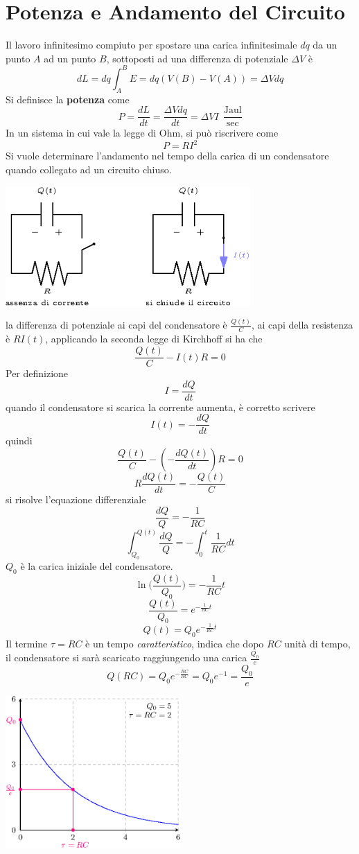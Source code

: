 \documentclass[10pt, letterpaper]{report}
\begin{document}
\section{Potenza e Andamento del Circuito}
Il lavoro infinitesimo compiuto per spostare una carica infinitesimale $dq$ da un punto $A$ ad un punto $B$, sottoposti ad una differenza di potenziale $\Delta V$ è 
$$ dL=dq\int_A^B E = dq(V(B)-V(A))= \Delta V dq$$
Si definisce la \textbf{potenza} come 
$$ P=\frac{dL}{dt}=\frac{\Delta Vdq}{dt}=\Delta V I \ \  \frac{\text{Jaul}}{\text{sec}}$$
In un sistema in cui vale la legge di Ohm, si può riscrivere come 
$$ P=RI^2$$
Si vuole determinare l'andamento nel tempo della carica di un condensatore quando collegato ad un circuito chiuso.\begin{center}
    \includegraphics[width=0.7\textwidth]{images/caricaCondensatoreTempo.eps}
\end{center}
la differenza di potenziale ai capi del  condensatore è $\frac{Q(t)}{C}$, ai capi della resistenza è $RI(t)$, applicando la seconda legge di Kirchhoff si ha che 
$$ \frac{Q(t)}{C}-I(t)R=0$$
Per definizione $$ I=\frac{dQ}{dt}$$
quando il condensatore si scarica la corrente aumenta, è corretto scrivere 
$$ I(t)=-\frac{dQ}{dt}$$
quindi 
$$ \frac{Q(t)}{C}-(-\frac{dQ(t)}{dt})R=0$$
$$ R\frac{dQ(t)}{dt}=-\frac{Q(t)}{C}$$
si risolve l'equazione differenziale 
$$ \frac{dQ}{Q}=-\frac{1}{RC}$$
$$ \int_{Q_0}^{Q(t)}\frac{dQ}{Q}=-\int_0^t\frac{1}{RC}dt$$
$Q_0$ è la carica iniziale del condensatore.
$$ \ln\Big(\frac{Q(t)}{Q_0}\Big)=-\frac{1}{RC}t$$
$$ \frac{Q(t)}{Q_0}=e^{-\frac{1}{RC}t}$$
$$ Q(t)=Q_0e^{-\frac{1}{RC}t}$$
Il termine $\tau=RC$ è un tempo \textit{caratteristico}, indica che dopo $RC$ unità di tempo, il condensatore si sarà scaricato raggiungendo una carica $\frac{Q_0}{e}$
$$ Q(RC)=Q_0e^{-\frac{RC}{RC}}=Q_0e^{-1}=\frac{Q_0}{e}$$
\begin{center}
    \includegraphics[width=0.5\textwidth]{images/tempoCaratteristico.eps}
\end{center}
\end{document}
